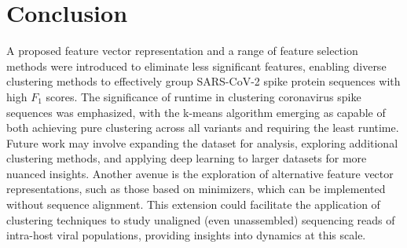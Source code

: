 \documentclass[%
 aip,
 jmp,%
 amsmath,amssymb,
 reprint,%
]{revtex4-2}
\begin{document}
\section{Conclusion}
A proposed feature vector representation and a range of feature selection methods were introduced to
eliminate less significant features, enabling diverse clustering methods to effectively group SARS-CoV-2
spike protein sequences with high $F_1$ scores. The significance of runtime in clustering coronavirus spike
sequences was emphasized, with the k-means algorithm emerging as capable of both achieving pure clustering
across all variants and requiring the least runtime. Future work may involve expanding the dataset for
analysis, exploring additional clustering methods, and applying deep learning to larger datasets for more
nuanced insights. Another avenue is the exploration of alternative feature vector representations, such as
those based on minimizers, which can be implemented without sequence alignment. This extension could facilitate
the application of clustering techniques to study unaligned (even unassembled) sequencing reads of intra-host
viral populations, providing insights into dynamics at this scale.

\nocite{*}
% 
\end{document}
